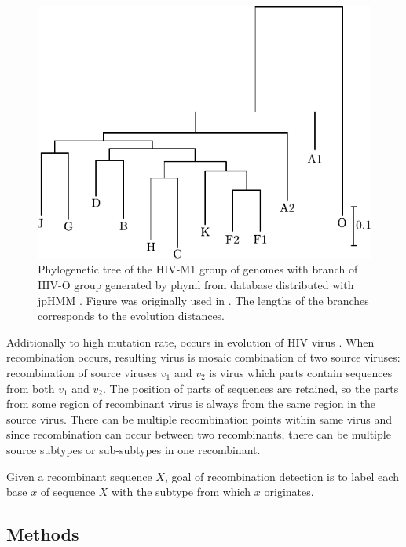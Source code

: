 \begin{figure}
\begin{center}
\includegraphics{../figures/hiv_M1strom}
\end{center}
\caption[Phylogenetic tree of the HIV-M1 group]{Phylogenetic tree of the HIV-M1
group of genomes with branch of HIV-O group generated by phyml \cite{Guidon2003}
from database distributed with jpHMM \cite{Schultz2006}. Figure was originally
used in \cite{Nanasi2010mgr}. The lengths of the branches corresponds to the
evolution distances.  }\label{app:figure:phil}
\end{figure}

Additionally to high mutation rate,  occurs in
evolution of HIV virus \cite{}. When recombination occurs, resulting virus is
mosaic combination of two source viruses: recombination of source viruses $v_1$
and $v_2$ is virus which parts contain sequences from both $v_1$ and $v_2$.  The
position of parts of sequences are retained, so the parts from some region of
recombinant virus is always from the same region in the source virus.
There can be multiple recombination points within same virus and since
recombination can occur between two recombinants, there can be multiple source
subtypes or sub-subtypes in one recombinant.

Given a recombinant sequence $X$, goal of recombination detection is to label
each base $x$ of sequence $X$ with the subtype from which $x$ originates.

\subsection{Methods}

